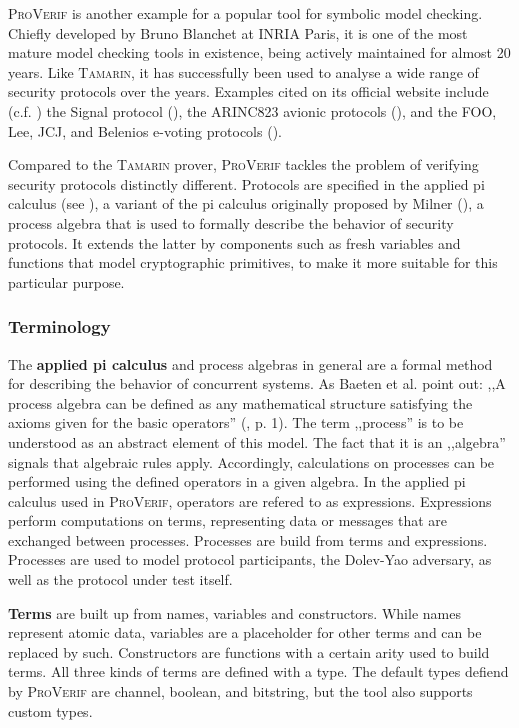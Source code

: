 \textsc{ProVerif} is another example for a popular tool for symbolic model checking.
Chiefly developed by Bruno Blanchet at INRIA Paris, it is one of the most mature model checking tools in existence, being actively maintained for almost 20 years.
Like \textsc{Tamarin}, it has successfully been used to analyse a wide range of security protocols over the years.
Examples cited on its official website include (c.f. \cite{proverif}) the Signal protocol (\cite{kobeissi2017automated}), the ARINC823 avionic protocols (\cite{blanchet2017symbolic}), and the FOO, Lee, JCJ, and Belenios e-voting protocols (\cite{hirschi2019improving}).

Compared to the \textsc{Tamarin} prover, \textsc{ProVerif} tackles the problem of verifying security protocols distinctly different.
Protocols are specified in the applied pi calculus (see \cite{abadi2017applied}), a variant of the pi calculus originally proposed by Milner (\cite{milner1999communicating}), a process algebra that is used to formally describe the behavior of security protocols.
It extends the latter by components such as fresh variables and functions that model cryptographic primitives, to make it more suitable for this particular purpose.

\subsubsection{Terminology}

The \textbf{applied pi calculus} and process algebras in general are a formal method for describing the behavior of concurrent systems.
As Baeten et al. point out: ,,A process algebra can be defined as any mathematical structure satisfying the axioms given for the basic operators'' (\cite{baeten2007process}, p. 1).
The term ,,process'' is to be understood as an abstract element of this model.
The fact that it is an ,,algebra'' signals that algebraic rules apply.
Accordingly, calculations on processes can be performed using the defined operators in a given algebra.
In the applied pi calculus used in \textsc{ProVerif}, operators are refered to as expressions.
Expressions perform computations on terms, representing data or messages that are exchanged between processes.
Processes are build from terms and expressions.
Processes are used to model protocol participants, the Dolev-Yao adversary, as well as the protocol under test itself.

\textbf{Terms} are built up from names, variables and constructors.
While names represent atomic data, variables are a placeholder for other terms and can be replaced by such.
Constructors are functions with a certain arity used to build terms.
All three kinds of terms are defined with a type.
The default types defiend by \textsc{ProVerif} are \textsf{channel}, \textsf{boolean}, and \textsf{bitstring}, but the tool also supports custom types.

